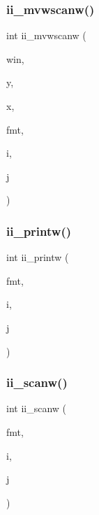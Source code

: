 \mbox{\label{C-macros_8c_a5116eef3b9a53d8f12436984bfec0717}} 
\subsubsection{\texorpdfstring{ii\+\_\+mvwscanw()}{ii\_mvwscanw()}}
{\footnotesize\ttfamily int ii\+\_\+mvwscanw (\begin{DoxyParamCaption}\item[{W\+I\+N\+D\+OW $\ast$}]{win,  }\item[{int}]{y,  }\item[{int}]{x,  }\item[{char $\ast$}]{fmt,  }\item[{int $\ast$}]{i,  }\item[{int $\ast$}]{j }\end{DoxyParamCaption})}

\mbox{\label{C-macros_8c_a485ef33f3e0fb3900f69d4b869b619f1}} 
\subsubsection{\texorpdfstring{ii\+\_\+printw()}{ii\_printw()}}
{\footnotesize\ttfamily int ii\+\_\+printw (\begin{DoxyParamCaption}\item[{const char $\ast$}]{fmt,  }\item[{int}]{i,  }\item[{int}]{j }\end{DoxyParamCaption})}

\mbox{\label{C-macros_8c_a13c589c66da48838bef7ced902997126}} 
\subsubsection{\texorpdfstring{ii\+\_\+scanw()}{ii\_scanw()}}
{\footnotesize\ttfamily int ii\+\_\+scanw (\begin{DoxyParamCaption}\item[{char $\ast$}]{fmt,  }\item[{int $\ast$}]{i,  }\item[{int $\ast$}]{j }\end{DoxyParamCaption})}

